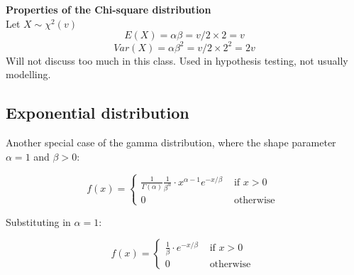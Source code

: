 
\textbf{Properties of the Chi-square distribution}\\
Let $X \sim \chi ^2 (v)$
$$E(X) = \alpha \beta = v / 2 \times 2 = v$$
$$Var(X) = \alpha \beta ^2 = v /2 \times 2^2 = 2v$$
Will not discuss too much in this class. Used in hypothesis testing, not usually modelling.

\subsection{Exponential distribution}
Another special case of the gamma distribution, where the shape parameter $\alpha = 1$ and $\beta > 0$:

\begin{equation}
    f(x) = 
    \begin{cases}
        \frac{1}{\Gamma (\alpha)} \frac{1}{\beta ^ \alpha} \cdot x^{\alpha - 1} e^{-x / \beta} & \text{ if } x > 0\\
        0 & \text{ otherwise }
    \end{cases}
\end{equation}

Substituting in $\alpha = 1$:

\begin{equation}
    f(x) = 
    \begin{cases}
        \frac{1}{\beta} \cdot e^{-x / \beta} & \text{ if } x > 0\\
        0 & \text{ otherwise }
    \end{cases}
\end{equation}


